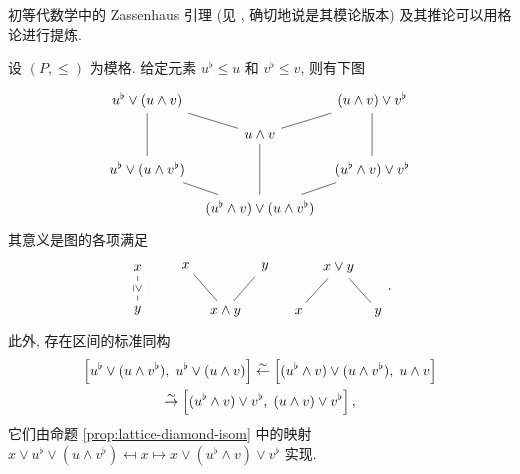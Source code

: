 初等代数学中的 Zassenhaus 引理 (见 \cite[引理 4.6.4]{Li1}, 确切地说是其模论版本) 及其推论可以用格论进行提炼.

\begin{theorem}\label{prop:lattice-Zassenhaus}
	设 $(P, \leq)$ 为模格. 给定元素 $u^\flat \leq u$ 和 $v^\flat \leq v$, 则有下图
	\[ \begin{tikzcd}[column sep=tiny, row sep=small]
		u^\flat \vee (u \wedge v) \arrow[dash, dd] \arrow[dash, rd] & & (u \wedge v) \vee v^\flat \arrow[dash, dd] \arrow[dash, ld] \\
		& u \wedge v \arrow[dash, dd] & \\
		u^\flat \vee (u \wedge v^\flat) \arrow[dash, rd] & & (u^\flat \wedge v) \vee v^\flat \arrow[dash, ld] \\
		& (u^\flat \wedge v) \vee (u \wedge v^\flat)
	\end{tikzcd} \]
	其意义是图的各项满足
	\begin{equation}\label{eqn:Zassenhaus-cases} \begin{tikzcd}
		x \arrow[dash, d, "\geq" description, sloped] \\ y
	\end{tikzcd} \qquad
	\begin{tikzcd}[column sep=tiny]
		x \arrow[dash, rd] & & y \arrow[dash, ld] \\
		& x \wedge y &
	\end{tikzcd} \quad
	\begin{tikzcd}[column sep=tiny]
		{} & x \vee y \arrow[dash, ld] \arrow[dash, rd] & \\
		x & & y
	\end{tikzcd} . \end{equation}
	此外, 存在区间的标准同构
	\begin{multline*}
		\left[ u^\flat \vee (u \wedge v^\flat), \; u^\flat \vee (u \wedge v) \right] \stackrel{\sim}{\leftarrow} \left[ (u^\flat \wedge v) \vee (u \wedge v^\flat), \; u \wedge v \right] \\
		\stackrel{\sim}{\rightarrow} \left[ (u^\flat \wedge v) \vee v^\flat, \; (u \wedge v) \vee v^\flat \right],
	\end{multline*}
	它们由命题 \ref{prop:lattice-diamond-isom} 中的映射 $x \vee u^\flat \vee (u \wedge v^\flat) \mapsfrom x \mapsto x \vee (u^\flat \wedge v) \vee v^\flat$ 实现.
\end{theorem}
